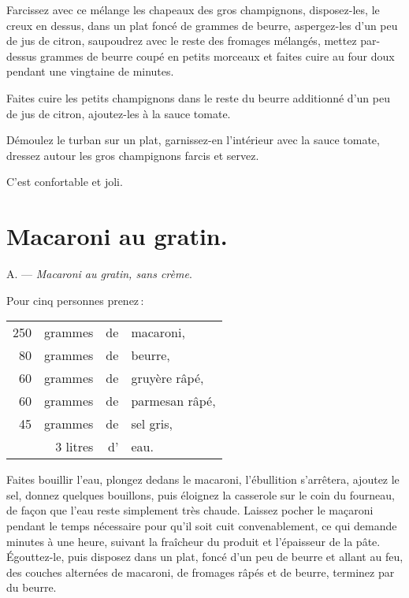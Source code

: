 Farcissez avec ce mélange les chapeaux des gros champignons, disposez-les, le
creux en dessus, dans un plat foncé de {\mmm} grammes de beurre,
aspergez-les d'un peu de jus de citron, saupoudrez avec le reste des fromages
mélangés, mettez par-dessus {\mmm} grammes de beurre coupé en petits
morceaux et faites cuire au four doux pendant une vingtaine de minutes.

Faites cuire les {\mmm} petits champignons dans le reste du beurre
additionné d'un peu de jus de citron, ajoutez-les à la sauce tomate.

Démoulez le turban sur un plat, garnissez-en l'intérieur avec la sauce tomate,
dressez autour les gros champignons farcis et servez.

C'est confortable et joli.

\section*{\centering Macaroni au gratin.}
{}

A. — \textit{Macaroni au gratin, sans crème}.

\medskip

Pour cinq personnes prenez :

\footnotesize
\begin{longtable}{rrrp{16em}}
    250 & grammes  & de & macaroni,                                                                       \\
     80 & grammes  & de & beurre,                                                                         \\
     60 & grammes  & de & gruyère râpé,                                                                   \\
     60 & grammes  & de & parmesan râpé,                                                                  \\
     45 & grammes  & de & sel gris,                                                                       \\
        & 3 litres & d' & eau.                                                                            \\
\end{longtable}
\normalsize

Faites bouillir l'eau, plongez dedans le macaroni, l'ébullition s'arrêtera,
ajoutez le sel, donnez quelques bouillons, puis éloignez la casserole sur le
coin du fourneau, de façon que l'eau reste simplement très chaude. Laissez
pocher le maçaroni pendant le temps nécessaire pour qu'il soit cuit
convenablement, ce qui demande {\mmm} minutes à une heure, suivant la
fraîcheur du produit et l'épaisseur de la pâte. Égouttez-le, puis disposez dans
un plat, foncé d'un peu de beurre et allant au feu, des couches alternées de
macaroni, de fromages râpés et de beurre, terminez par du beurre.

